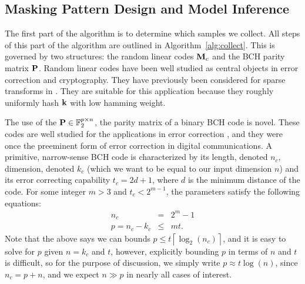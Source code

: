 \subsection{Masking Pattern Design and Model Inference}
The first part of the algorithm is to determine which samples we collect. All steps of this part of the algorithm are outlined in Algorithm~\ref{alg:collect}. This is governed by two structures: the random linear codes $\mathbf M_c$ and the BCH parity matrix $\mathbf P$. Random linear codes have been well studied as central objects in error correction and cryptography. They have previously been considered for sparse transforms in \cite{amrollahi2019efficiently}. They are suitable for this application because they roughly uniformly hash $\mathbf k$ with low hamming weight. 

The use of the $\mathbf P \in \mathbb F_2^{p\times n}$, the parity matrix of a binary BCH code is novel. These codes are well studied for the applications in error correction \cite{Lin1999}, and they were once the preeminent form of error correction in digital communications. A primitive, narrow-sense BCH code is characterized by its length, denoted $n_c$, dimension, denoted $k_c$ (which we want to be equal to our input dimension $n$) and its error correcting capability $t_c = 2d + 1$, where $d$ is the minimum distance of the code. For some integer $m > 3$ and $t_c < 2^{m-1}$, the parameters satisfy the following equations:
\begin{eqnarray}
    n_c &=& 2^m -1 \\
    p = n_c-k_c &\leq& mt.
\end{eqnarray}
Note that the above says we can bounds $p \leq t \left\lceil \log_2(n_c) \right \rceil$, and it is easy to solve for $p$ given $n=k_c$ and $t$, however, explicitly bounding $p$ in terms of $n$ and $t$ is difficult, so for the purpose of discussion, we simply write $p \approx{t\log(n)}$, since $n_c = p + n$, and we expect $n \gg p$ in nearly all cases of interest. 

